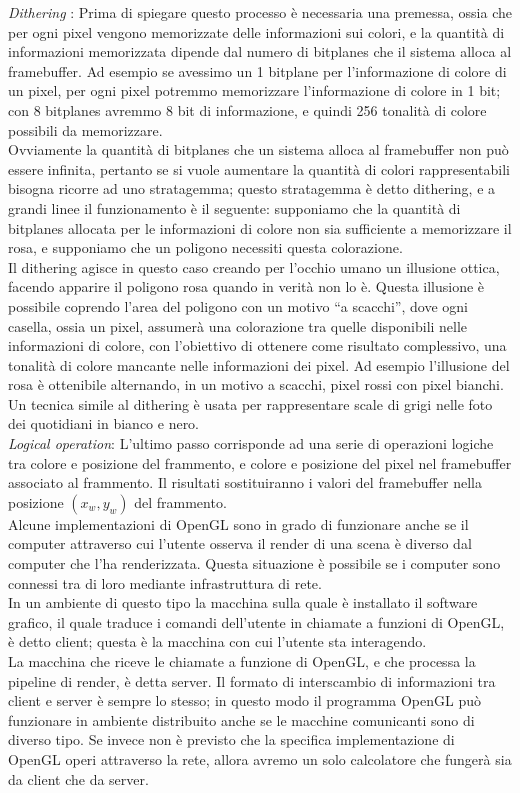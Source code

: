 \emph{Dithering} : Prima di spiegare questo processo è necessaria una premessa, ossia che per ogni pixel vengono memorizzate delle informazioni sui colori, e la quantità di informazioni memorizzata dipende dal numero di bitplanes che il sistema alloca al framebuffer.
Ad esempio se avessimo un 1 bitplane per l’informazione di colore di un pixel, per ogni pixel potremmo memorizzare l’informazione di colore in 1 bit; con 8 bitplanes avremmo 8 bit di informazione, e quindi 256 tonalità di colore possibili da memorizzare. 
\\
Ovviamente la quantità di bitplanes che un sistema alloca al framebuffer non può essere infinita, pertanto se si vuole aumentare la quantità di colori rappresentabili bisogna ricorre ad uno stratagemma; questo stratagemma è detto dithering, e a grandi linee il funzionamento è il seguente: supponiamo che la quantità di bitplanes allocata per le informazioni di colore non sia sufficiente a memorizzare il rosa, e supponiamo che un poligono necessiti questa colorazione. 
\\
Il dithering agisce in questo caso creando per l’occhio umano un illusione ottica, facendo apparire il poligono rosa quando in verità non lo è. Questa illusione è possibile coprendo l’area del poligono con un motivo “a scacchi”, dove ogni casella, ossia un pixel, assumerà una colorazione tra quelle disponibili nelle informazioni di colore, con l’obiettivo di ottenere come risultato complessivo, una tonalità di colore mancante nelle informazioni dei pixel. Ad esempio l’illusione del rosa è ottenibile alternando, in un motivo a scacchi, pixel rossi con pixel bianchi. Un tecnica simile al dithering è usata per rappresentare scale di grigi nelle foto dei quotidiani in bianco e nero.
\\

\emph{Logical operation}: L’ultimo passo corrisponde ad una serie di operazioni logiche tra colore e posizione del frammento, e colore e posizione del pixel nel framebuffer associato al frammento. Il risultati sostituiranno i valori del framebuffer nella posizione $(x_w,y_w)$ del frammento.
\\

Alcune implementazioni di OpenGL sono in grado di funzionare anche se il computer attraverso cui l’utente osserva il render di una scena è diverso dal computer che l’ha renderizzata.
Questa situazione è possibile se i computer sono connessi tra di loro mediante infrastruttura di rete.
\\
In un ambiente di questo tipo la macchina sulla quale è installato il software grafico, il quale traduce i comandi dell’utente in chiamate a funzioni di OpenGL, è detto client; questa è la macchina con cui l’utente sta interagendo. 
\\
La macchina che riceve le chiamate a funzione di OpenGL, e che processa la pipeline di render, è detta server. Il formato di interscambio di informazioni tra client e server è sempre lo stesso; in questo modo il programma OpenGL può funzionare in ambiente distribuito anche se le macchine comunicanti sono di diverso tipo. Se invece non è previsto che la specifica implementazione di OpenGL operi attraverso la rete, allora avremo un solo calcolatore che fungerà sia da client che da server.
